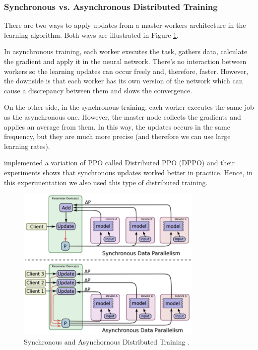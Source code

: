 \subsubsection{Synchronous vs. Asynchronous Distributed Training}

There are two ways to apply updates from a master-workers architecture in the learning algorithm. Both ways are illustrated in Figure \ref{fig:distributedtraining}.

In asynchronous training, each worker executes the task, gathers data, calculate the gradient and apply it in the neural network. There's no interaction between workers so the learning updates can occur freely and, therefore, faster. However, the downside is that each worker has its own version of the network which can cause a discrepancy between them and slows the convergence.

On the other side, in the synchronous training, each worker executes the same job as the asynchronous one. However, the master node collects the gradients and applies an average from them. In this way, the updates occurs in the same frequency, but they are much more precise (and therefore we can use large learning rates). 

\citeauthor{heess2017} implemented a variation of PPO called Distributed PPO (DPPO) and their experiments shows that synchronous updates worked better in practice. Hence, in this experimentation we also used this type of distributed training.

\begin{figure}[H]
	\centering
	\includegraphics[width=0.8\textwidth]{Cap5/distributedtraining.eps}
	\caption{ Synchronous and Asynchornous Distributed Training \cite{tensorflow2015-whitepaper}.
	}
	\label{fig:distributedtraining}
\end{figure}

